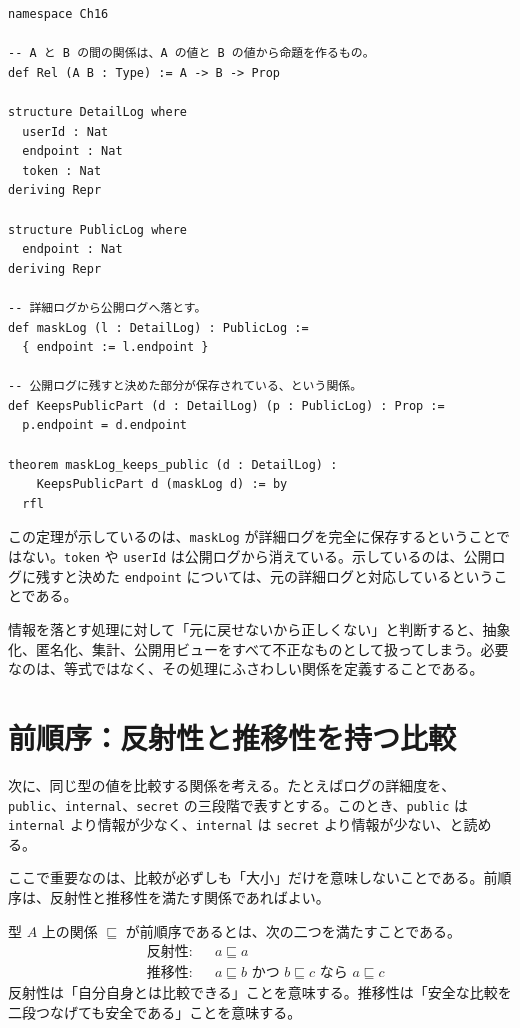 \begin{listing}[htbp]
\begin{verbatim}
namespace Ch16

-- A と B の間の関係は、A の値と B の値から命題を作るもの。
def Rel (A B : Type) := A -> B -> Prop

structure DetailLog where
  userId : Nat
  endpoint : Nat
  token : Nat
deriving Repr

structure PublicLog where
  endpoint : Nat
deriving Repr

-- 詳細ログから公開ログへ落とす。
def maskLog (l : DetailLog) : PublicLog :=
  { endpoint := l.endpoint }

-- 公開ログに残すと決めた部分が保存されている、という関係。
def KeepsPublicPart (d : DetailLog) (p : PublicLog) : Prop :=
  p.endpoint = d.endpoint

theorem maskLog_keeps_public (d : DetailLog) :
    KeepsPublicPart d (maskLog d) := by
  rfl
\end{verbatim}
\caption{詳細ログと公開ログの間の関係}
\label{lst:ch16-relation}
\end{listing}

この定理が示しているのは、\texttt{maskLog} が詳細ログを完全に保存するということではない。\texttt{token} や \texttt{userId} は公開ログから消えている。示しているのは、公開ログに残すと決めた \texttt{endpoint} については、元の詳細ログと対応しているということである。

\begin{warningbox}
情報を落とす処理に対して「元に戻せないから正しくない」と判断すると、抽象化、匿名化、集計、公開用ビューをすべて不正なものとして扱ってしまう。必要なのは、等式ではなく、その処理にふさわしい関係を定義することである。
\end{warningbox}

\section{前順序：反射性と推移性を持つ比較}

次に、同じ型の値を比較する関係を考える。たとえばログの詳細度を、\texttt{public}、\texttt{internal}、\texttt{secret} の三段階で表すとする。このとき、\texttt{public} は \texttt{internal} より情報が少なく、\texttt{internal} は \texttt{secret} より情報が少ない、と読める。

ここで重要なのは、比較が必ずしも「大小」だけを意味しないことである。前順序は、反射性と推移性を満たす関係であればよい。

\begin{definitionbox}
型 \(A\) 上の関係 \(\sqsubseteq\) が前順序であるとは、次の二つを満たすことである。
\[
\begin{aligned}
&\text{反射性:} && a \sqsubseteq a \\
&\text{推移性:} && a \sqsubseteq b \text{ かつ } b \sqsubseteq c \text{ なら } a \sqsubseteq c
\end{aligned}
\]
反射性は「自分自身とは比較できる」ことを意味する。推移性は「安全な比較を二段つなげても安全である」ことを意味する。
\end{definitionbox}

